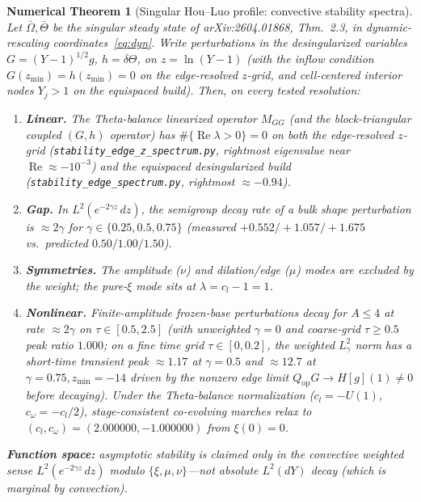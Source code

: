 \documentclass[11pt,a4paper]{article}
\newtheorem{numthm}{Numerical Theorem}
\begin{document}
\begin{numthm}[Singular Hou--Luo profile: convective stability spectra]
\label{numthm:main}
Let $\bar\Omega,\bar\Theta$ be the singular steady state of arXiv:2604.01868, Thm.~2.3,
in dynamic-rescaling coordinates~\eqref{eq:dyn}.  Write perturbations in the
desingularized variables $G=(Y-1)^{1/2}g$, $h=\delta\Theta$, on $z=\ln(Y-1)$ (with the
inflow condition $G(z_{\min})=h(z_{\min})=0$ on the edge-resolved $z$-grid, and cell-centered
interior nodes $Y_j>1$ on the equispaced build).  Then, on every tested resolution:
\begin{enumerate}
\item \textbf{Linear.} The Theta-balance linearized operator $M_{GG}$ (and the block-triangular coupled
  $(G,h)$ operator) has $\#\{\operatorname{Re}\lambda>0\}=0$ on both the edge-resolved
  $z$-grid (\texttt{stability\_edge\_z\_\allowbreak spectrum.py}, rightmost eigenvalue near $\operatorname{Re}\approx -10^{-3}$)
  and the equispaced desingularized build (\texttt{stability\_\allowbreak edge\_\allowbreak spectrum.py}, rightmost $\approx -0.94$).
\item \textbf{Gap.} In $L^2(e^{-2\gamma z}\,dz)$, the semigroup decay rate of a bulk
  shape perturbation is $\approx 2\gamma$ for $\gamma\in\{0.25,0.5,0.75\}$
  (measured $+0.552/+1.057/+1.675$ vs.\ predicted $0.50/1.00/1.50$).
\item \textbf{Symmetries.} The amplitude ($\nu$) and dilation/edge ($\mu$) modes are
  excluded by the weight; the pure-$\xi$ mode sits at $\lambda=c_l-1=1$.
\item \textbf{Nonlinear.} Finite-amplitude frozen-base perturbations decay for
  $A\le 4$ at rate $\approx 2\gamma$ on $\tau\in[0.5,2.5]$ (with unweighted $\gamma=0$ and
  coarse-grid $\tau\ge 0.5$ peak ratio $1.000$; on a fine time grid $\tau\in[0,0.2]$, the
  weighted $L^2_\gamma$ norm has a short-time transient peak $\approx 1.17$ at
  $\gamma=0.5$ and $\approx 12.7$ at $\gamma=0.75,z_{\min}=-14$ driven by the nonzero edge limit
  $Q_{\mathrm{op}}G\to H[g](1)\ne 0$ before decaying).
  Under the Theta-balance normalization ($c_l=-U(1)$, $c_\omega=-c_l/2$), stage-consistent
  co-evolving marches relax to $(c_l,c_\omega)=(2.000000,-1.000000)$ from $\xi(0)=0$.
\end{enumerate}
\textbf{Function space:} asymptotic stability is claimed only in the convective
weighted sense $L^2(e^{-2\gamma z}\,dz)$ modulo $\{\xi,\mu,\nu\}$---not absolute
$L^2(dY)$ decay (which is marginal by convection).
\end{numthm}
\end{document}
